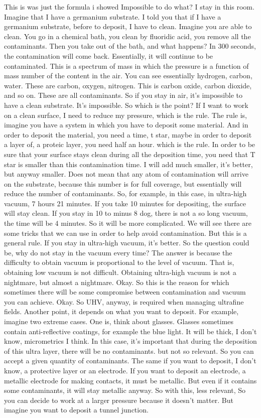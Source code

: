 This is was just the formula i showed Impossible to do what? I stay in this room. Imagine that I have a germanium substrate. I told you that if I have a germanium substrate, before to deposit, I have to clean. Imagine you are able to clean. You go in a chemical bath, you clean by fluoridic acid, you remove all the contaminants. Then you take out of the bath, and what happens? In 300 seconds, the contamination will come back. Essentially, it will continue to be contaminated. This is a spectrum of mass in which the pressure is a function of mass number of the content in the air. You can see essentially hydrogen, carbon, water. These are carbon, oxygen, nitrogen. This is carbon oxide, carbon dioxide, and so on. These are all contaminants. So if you stay in air, it's impossible to have a clean substrate. It's impossible. So which is the point? If I want to work on a clean surface, I need to reduce my pressure, which is the rule. The rule is, imagine you have a system in which you have to deposit some material. And in order to deposit the material, you need a time, t star, maybe in order to deposit a layer of, a proteic layer, you need half an hour. which is the rule. In order to be sure that your surface stays clean during all the deposition time, you need that T star is smaller than this contamination time. I will add much smaller, it's better, but anyway smaller. Does not mean that any atom of contamination will arrive on the substrate, because this number is for full coverage, but essentially will reduce the number of contaminants. So, for example, in this case, in ultra-high vacuum, 7 hours 21 minutes. If you take 10 minutes for depositing, the surface will stay clean. If you stay in 10 to minus 8 dog, there is not a so long vacuum, the time will be 4 minutes. So it will be more complicated. We will see there are some tricks that we can use in order to help avoid contamination. But this is a general rule. If you stay in ultra-high vacuum, it's better. So the question could be, why do not stay in the vacuum every time? The answer is because the difficulty to obtain vacuum is proportional to the level of vacuum. That is, obtaining low vacuum is not difficult. Obtaining ultra-high vacuum is not a nightmare, but almost a nightmare. Okay. So this is the reason for which sometimes there will be some compromise between contamination and vacuum you can achieve. Okay. So UHV, anyway, is required when managing ultrafine fields. Another point, it depends on what you want to deposit. For example, imagine two extreme cases. One is, think about glasses. Glasses sometimes contain anti-reflective coatings, for example the blue light. It will be thick, I don't know, micrometrics I think. In this case, it's important that during the deposition of this ultra layer, there will be no contaminants. but not so relevant. So you can accept a given quantity of contaminants. The same if you want to deposit, I don't know, a protective layer or an electrode. If you want to deposit an electrode, a metallic electrode for making contacts, it must be metallic. But even if it contains some contaminants, it will stay metallic anyway. So with this, less relevant, So you can decide to work at a larger pressure because it doesn't matter. But imagine you want to deposit a tunnel junction. 